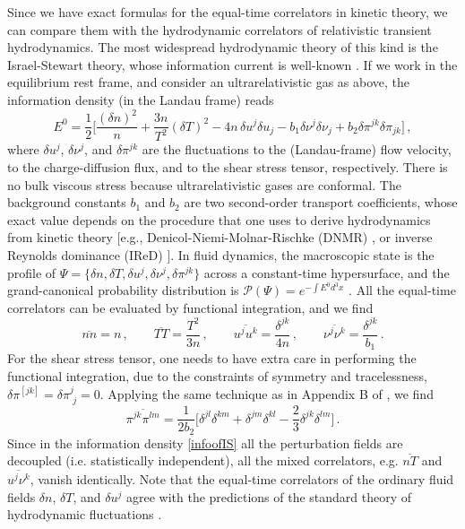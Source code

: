 \documentclass[aps,prd,preprint,nofootinbib,amsmath,amssymb,showpacs,longbibliography,singlecolumn,superscriptaddress,10pt]{revtex4-1}
\theoremstyle{plain}
\theoremstyle{definition}
\begin{document}
Since we have exact formulas for the equal-time correlators in kinetic theory, we can compare them with the hydrodynamic correlators of relativistic transient hydrodynamics. The most widespread hydrodynamic theory of this kind is the Israel-Stewart theory, whose information current is well-known \cite{OLSON199018,GavassinoSymmetricQuasi2022roi}. If we work in the equilibrium rest frame, and consider an ultrarelativistic gas as above, the information density (in the Landau frame) reads
\begin{equation}\label{infoofIS}
    E^0 = \dfrac{1}{2} \bigg[ \dfrac{(\delta n)^2}{n} + \dfrac{3n}{T^2} (\delta T)^2 -4n \,\delta u^j \delta u_j -b_1 \delta \nu^j \delta \nu_j+b_2 \delta \pi^{jk}\delta \pi_{jk} \bigg] \, ,
\end{equation}
where $\delta u^j$, $\delta \nu^j$, and $\delta \pi^{jk}$ are the fluctuations to the (Landau-frame) flow velocity, to the charge-diffusion flux, and to the shear stress tensor, respectively. There is no bulk viscous stress because ultrarelativistic gases are conformal. The background constants $b_1$ and $b_2$ are two second-order transport coefficients, whose exact value depends on the procedure that one uses to derive hydrodynamics from kinetic theory [e.g., Denicol-Niemi-Molnar-Rischke (DNMR) \cite{Denicol:2012cn}, or inverse Reynolds dominance (IReD) \cite{Wagner:2022ayd}]. In fluid dynamics, the macroscopic state is the profile of $\Psi=\{\delta n,\delta T, \delta u^j,\delta \nu^j,\delta \pi^{jk} \}$ across a constant-time hypersurface, and the grand-canonical probability distribution is $\mathcal{P}(\Psi)=e^{-\int E^0 d^3x}$ \cite{Gavassino:2021kjm}. All the equal-time correlators can be evaluated by functional integration, and we find
\begin{equation}\label{fluxium}
    \overline{nn}=n \, , \quad \quad \overline{TT}=\dfrac{T^2}{3n} \, , \quad \quad \overline{u^j u^k}=\dfrac{\delta^{jk}}{4n} \, , \quad \quad \overline{\nu^j \nu^k}=\dfrac{\delta^{jk}}{b_1} \, .
\end{equation}
For the shear stress tensor, one needs to have extra care in performing the functional integration, due to the constraints of symmetry and tracelessness, $\delta \pi^{[jk]}=\delta \pi^j_{\, \, j}=0$. Applying the same technique as in Appendix B of \cite{Gavassino:2022roi}, we find
\begin{equation}\label{fluxium2}
    \overline{\pi^{jk}\pi^{lm}}= \dfrac{1}{2b_2} \bigg[\delta^{jl}\delta^{km}+\delta^{jm}\delta^{kl}-\dfrac{2}{3} \delta^{jk}\delta^{lm} \bigg] \, . 
\end{equation}
Since in the information density \eqref{infoofIS} all the perturbation fields are decoupled (i.e. statistically independent), all the mixed correlators, e.g. $\overline{nT}$ and $\overline{u^j\nu^k}$, vanish identically. Note that the equal-time correlators of the ordinary fluid fields $\delta n$, $\delta T$, and $\delta u^j$ agree with the predictions of the standard theory of hydrodynamic fluctuations \cite{landau_statistical_part_II}.
\end{document}

